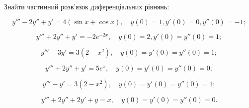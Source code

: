 Знайти частинний розв'язок диференціальних рівнянь:
\begin{problem}
	\[y'''-2y''+y'=4(\sin x+\cos x),\quad y(0)=1,y'(0)=0,y''(0)=-1;\]
\end{problem}

\begin{problem}
	\[y'''+2y''+y'=-2e^{-2x},\quad y(0)=2,y'(0)=y''(0)=1;\]
\end{problem}

\begin{problem}
	\[y'''-3y'=3(2-x^2),\quad y(0)=y'(0)=y''(0)=1;\]
\end{problem}

\begin{problem}
	\[y'''+2y''+y'=5e^x,\quad y(0)=y'(0)=y''(0)=0;\]
\end{problem}

\begin{problem}
	\[y'''-y'=3(2-x^2),\quad y(0)=y'(0)=y''(0)=1;\]
\end{problem}

\begin{problem}
	\[y'''+2y''+2y'+y=x,\quad y(0)=y'(0)=y''(0)=0.\]
\end{problem}
